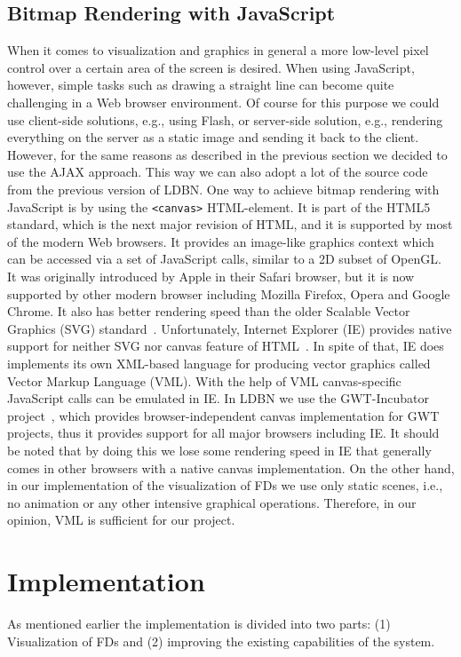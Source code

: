 \subsection{Bitmap Rendering with JavaScript}
\label{sec:renderingJS}
When it comes to visualization and graphics in general a more low-level 
pixel control over a certain area of the screen is desired. 
When using JavaScript, however, simple tasks such as drawing a straight
line can become quite challenging in a Web browser environment.
Of course for this purpose we could use client-side solutions, e.g., 
using Flash, or server-side solution, e.g., 
rendering everything on the server as a static image 
and sending it back
to the client. However, for the same reasons as described in the previous
section we decided to use the AJAX approach. This way we can also
adopt a lot of the source code from the previous version of LDBN. 
One way to achieve bitmap rendering with JavaScript is by
using the \verb=<canvas>= HTML-element. 
It is part of the HTML5~\cite{html5} standard, which is the next major revision of HTML, and it is supported by
most of the modern Web browsers. It provides an image-like 
graphics context which can be accessed via a set of JavaScript calls, 
similar to a 2D subset of OpenGL. 
It was originally introduced by Apple in their Safari browser, but it is now 
supported by other modern browser including Mozilla Firefox, Opera and Google Chrome.
It also has better rendering speed than the older Scalable Vector Graphics (SVG) standard~\cite{w8}. 
Unfortunately, Internet Explorer (IE) provides native support for 
neither SVG nor canvas feature of HTML~\cite{w9}. In spite of that, IE does 
implements its own XML-based language for producing vector graphics 
called Vector Markup Language (VML). With the help of VML canvas-specific JavaScript 
calls can be emulated in IE. In LDBN we use the GWT-Incubator project~\cite{gwtincubator}, which provides
browser-independent canvas implementation for GWT projects, thus 
it provides support for all major browsers including IE. 
It should be noted that by doing this
we lose some rendering speed in IE that generally comes in other browsers
with a native canvas implementation. 
On the other hand, in our implementation of the visualization of FDs we use only static scenes, i.e., 
no animation or any other intensive 
graphical operations. Therefore, in our opinion, VML is sufficient for our project. 

\section{Implementation}
\label{sec:implementation}
As mentioned earlier the implementation is divided into two parts: 
(1) Visualization of FDs and 
(2) improving the existing capabilities of the system.

